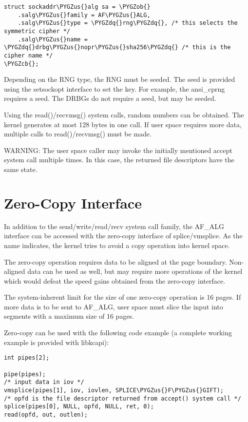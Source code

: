 \documentclass[a4paper,8pt,english]{sphinxmanual}
\def\PYGZus{\char`\_}
\def\PYGZob{\char`\{}
\def\PYGZcb{\char`\}}
\def\PYGZdq{\char`\"}
\begin{document}
\begin{Verbatim}[commandchars=\\\{\}]
struct sockaddr\PYGZus{}alg sa = \PYGZob{}
    .salg\PYGZus{}family = AF\PYGZus{}ALG,
    .salg\PYGZus{}type = \PYGZdq{}rng\PYGZdq{}, /* this selects the symmetric cipher */
    .salg\PYGZus{}name = \PYGZdq{}drbg\PYGZus{}nopr\PYGZus{}sha256\PYGZdq{} /* this is the cipher name */
\PYGZcb{};
\end{Verbatim}

Depending on the RNG type, the RNG must be seeded. The seed is provided
using the setsockopt interface to set the key. For example, the
ansi\_cprng requires a seed. The DRBGs do not require a seed, but may be
seeded.

Using the read()/recvmsg() system calls, random numbers can be obtained.
The kernel generates at most 128 bytes in one call. If user space
requires more data, multiple calls to read()/recvmsg() must be made.

WARNING: The user space caller may invoke the initially mentioned accept
system call multiple times. In this case, the returned file descriptors
have the same state.


\section{Zero-Copy Interface}
\label{crypto/userspace-if:zero-copy-interface}
In addition to the send/write/read/recv system call family, the AF\_ALG
interface can be accessed with the zero-copy interface of
splice/vmsplice. As the name indicates, the kernel tries to avoid a copy
operation into kernel space.

The zero-copy operation requires data to be aligned at the page
boundary. Non-aligned data can be used as well, but may require more
operations of the kernel which would defeat the speed gains obtained
from the zero-copy interface.

The system-inherent limit for the size of one zero-copy operation is 16
pages. If more data is to be sent to AF\_ALG, user space must slice the
input into segments with a maximum size of 16 pages.

Zero-copy can be used with the following code example (a complete
working example is provided with libkcapi):

\begin{Verbatim}[commandchars=\\\{\}]
int pipes[2];

pipe(pipes);
/* input data in iov */
vmsplice(pipes[1], iov, iovlen, SPLICE\PYGZus{}F\PYGZus{}GIFT);
/* opfd is the file descriptor returned from accept() system call */
splice(pipes[0], NULL, opfd, NULL, ret, 0);
read(opfd, out, outlen);
\end{Verbatim}
\end{document}
